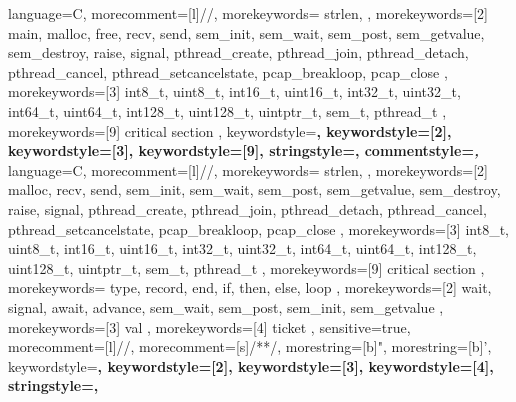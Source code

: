 %
%
\lstset{
	emph={%
    	critical,
    	section
    },
    emphstyle={\color{red}\bfseries}%
}%
{
	language=C,
	morecomment=[l]{//},
	morekeywords={
		strlen,
	},
	morekeywords=[2]{
	    main,
		malloc,
		free,
		recv,
		send,
		sem_init,
		sem_wait,
		sem_post,
		sem_getvalue,
		sem_destroy,
		raise,
		signal,
		pthread_create,
		pthread_join,
		pthread_detach,
		pthread_cancel,
		pthread_setcancelstate,
		pcap_breakloop,
		pcap_close
	},
	morekeywords=[3]{
		int8_t,
		uint8_t,
		int16_t,
		uint16_t,
		int32_t,
		uint32_t,
		int64_t,
		uint64_t,
		int128_t,
		uint128_t,
		uintptr_t,
		sem_t,
		pthread_t
	},
	morekeywords=[9]{
		critical section
	},
	keywordstyle=\color{eclipse_keyword1}\bfseries,
	keywordstyle=[2]\color{eclipse_keyword2}\bfseries,
	keywordstyle=[3]\color{eclipse_keyword3}\bfseries,
	keywordstyle=[9]\color{red}\bfseries,
	stringstyle=\color{eclipse_string},
	commentstyle=\color{eclipse_comment}\itshape,
}
{
	language=C,
	morecomment=[l]{//},
	morekeywords={
		strlen,
	},
	morekeywords=[2]{
		malloc,
		recv,
		send,
		sem_init,
		sem_wait,
		sem_post,
		sem_getvalue,
		sem_destroy,
		raise,
		signal,
		pthread_create,
		pthread_join,
		pthread_detach,
		pthread_cancel,
		pthread_setcancelstate,
		pcap_breakloop,
		pcap_close
	},
	morekeywords=[3]{
		int8_t,
		uint8_t,
		int16_t,
		uint16_t,
		int32_t,
		uint32_t,
		int64_t,
		uint64_t,
		int128_t,
		uint128_t,
		uintptr_t,
		sem_t,
		pthread_t
	},
	morekeywords=[9]{
		critical section
	},
}
{
	morekeywords={
		type,
		record,
		end,
		if,
		then,
		else,
		loop
	},
	morekeywords=[2]{
		wait,
		signal,
		await,
		advance,
		sem_wait,
		sem_post,
		sem_init,
		sem_getvalue
	},
	morekeywords=[3]{
		val
	},
	morekeywords=[4]{
		ticket
	},
	sensitive=true,
	morecomment=[l]{//},
	morecomment=[s]{/*}{*/},
	morestring=[b]",
	morestring=[b]',
	keywordstyle=\bfseries\ttfamily\color{blue},
	keywordstyle=[2]\bfseries\ttfamily\color{teal},
	keywordstyle=[3]\bfseries\ttfamily\color{olive},
	keywordstyle=[4]\bfseries\ttfamily\color{olive},
	stringstyle=\color{green}\ttfamily,
}
%

